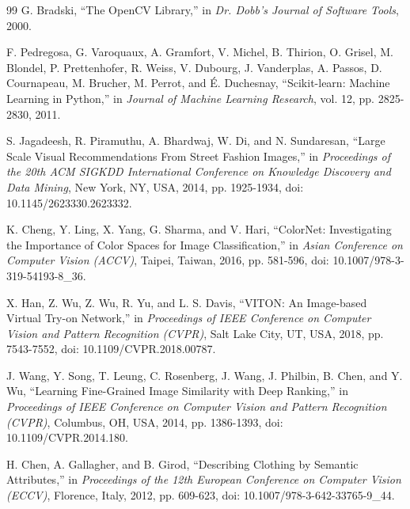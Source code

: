 \documentclass[12pt,a4paper]{report}
\begin{document}
\begin{thebibliography}{99}
G. Bradski, ``The OpenCV Library,'' in \textit{Dr. Dobb's Journal of Software Tools}, 2000.

F. Pedregosa, G. Varoquaux, A. Gramfort, V. Michel, B. Thirion, O. Grisel, M. Blondel, P. Prettenhofer, R. Weiss, V. Dubourg, J. Vanderplas, A. Passos, D. Cournapeau, M. Brucher, M. Perrot, and É. Duchesnay, ``Scikit-learn: Machine Learning in Python,'' in \textit{Journal of Machine Learning Research}, vol. 12, pp. 2825-2830, 2011.

S. Jagadeesh, R. Piramuthu, A. Bhardwaj, W. Di, and N. Sundaresan, ``Large Scale Visual Recommendations From Street Fashion Images,'' in \textit{Proceedings of the 20th ACM SIGKDD International Conference on Knowledge Discovery and Data Mining}, New York, NY, USA, 2014, pp. 1925-1934, doi: 10.1145/2623330.2623332.

K. Cheng, Y. Ling, X. Yang, G. Sharma, and V. Hari, ``ColorNet: Investigating the Importance of Color Spaces for Image Classification,'' in \textit{Asian Conference on Computer Vision (ACCV)}, Taipei, Taiwan, 2016, pp. 581-596, doi: 10.1007/978-3-319-54193-8\_36.

X. Han, Z. Wu, Z. Wu, R. Yu, and L. S. Davis, ``VITON: An Image-based Virtual Try-on Network,'' in \textit{Proceedings of IEEE Conference on Computer Vision and Pattern Recognition (CVPR)}, Salt Lake City, UT, USA, 2018, pp. 7543-7552, doi: 10.1109/CVPR.2018.00787.

J. Wang, Y. Song, T. Leung, C. Rosenberg, J. Wang, J. Philbin, B. Chen, and Y. Wu, ``Learning Fine-Grained Image Similarity with Deep Ranking,'' in \textit{Proceedings of IEEE Conference on Computer Vision and Pattern Recognition (CVPR)}, Columbus, OH, USA, 2014, pp. 1386-1393, doi: 10.1109/CVPR.2014.180.

H. Chen, A. Gallagher, and B. Girod, ``Describing Clothing by Semantic Attributes,'' in \textit{Proceedings of the 12th European Conference on Computer Vision (ECCV)}, Florence, Italy, 2012, pp. 609-623, doi: 10.1007/978-3-642-33765-9\_44.

\end{thebibliography}
\end{document}
